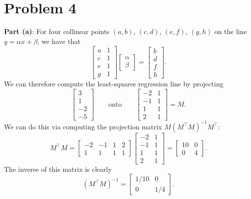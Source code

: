 \documentclass[11pt]{article}
\begin{document}
\section{Problem 4}

\textbf{Part (a)}: For four collinear points $(a, b)$, $(c, d)$, $(e, f)$, $(g, h)$ on the line $y = \alpha x + \beta$, we have that
\[
	\begin{bmatrix} a & 1 \\ c & 1 \\ e & 1 \\ g & 1 \end{bmatrix} \begin{bmatrix} \alpha \\ \beta \end{bmatrix} = \begin{bmatrix} b \\ d \\ f \\ h \end{bmatrix}.
\]
We can therefore compute the least-squares regression line by projecting
\[
	\begin{bmatrix} 3 \\ 1 \\ -2 \\ -5 \end{bmatrix} \qquad \text{onto} \qquad \begin{bmatrix} -2 & 1 \\ -1 & 1 \\ 1 & 1 \\ 2 & 1 \end{bmatrix} = M.
\]
We can do this via computing the projection matrix $M (M^{\top}M)^{-1}M^{\top}$:
\[
	M^{\top}M = \begin{bmatrix} -2 & -1 & 1 & 2 \\ 1 & 1 & 1 & 1 \end{bmatrix} \begin{bmatrix} -2 & 1 \\ -1 & 1 \\ 1 & 1 \\ 2 & 1 \end{bmatrix} = \begin{bmatrix} 10 & 0 \\ 0 & 4 \end{bmatrix}.
\]
The inverse of this matrix is clearly 
\[
	(M^{\top}M)^{-1} = \begin{bmatrix} 1/10 & 0 \\ 0 & 1/4 \end{bmatrix}.
\]
\end{document}
